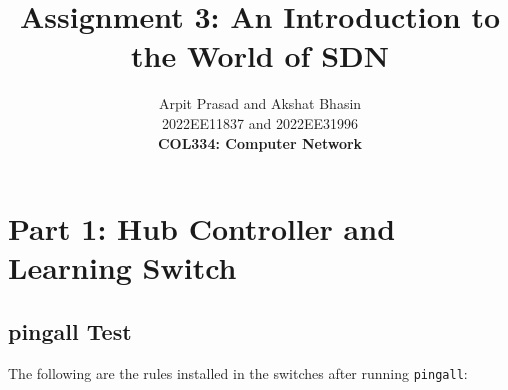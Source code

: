\documentclass[12pt]{article}
\begin{document}
 
 
\title{\textbf{Assignment 3: An Introduction to the World of SDN}}
\author{Arpit Prasad and Akshat Bhasin\\ 2022EE11837 and 2022EE31996 \\
\textbf{COL334: Computer Network}}

\maketitle

\section{Part 1: Hub Controller and Learning Switch}

\subsection{pingall Test}

The following are the rules installed in the switches after running \texttt{pingall}:
\end{document}
